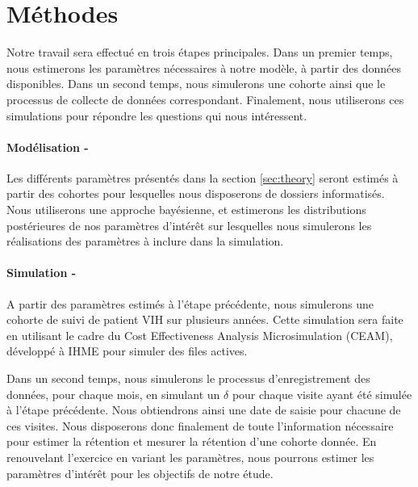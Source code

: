 \documentclass[paper=a4, fontsize=11pt]{scrartcl}
\numberwithin{equation}{section}		%
\numberwithin{figure}{section}			%
\numberwithin{table}{section}				%
\begin{document}
\section{Méthodes}

Notre travail sera effectué en trois étapes principales. Dans un premier temps, nous estimerons les paramètres nécessaires à notre modèle, à partir des données disponibles. Dans un second temps, nous simulerons une cohorte ainsi que le processus de collecte de données correspondant. Finalement, nous utiliserons ces simulations pour répondre les questions qui nous intéressent.

\paragraph{Modélisation -} Les différents paramètres présentés dans la section \ref{sec:theory} seront estimés à partir des cohortes pour lesquelles nous disposerons de dossiers informatisés. Nous utiliserons une approche bayésienne, et estimerons les distributions postérieures de nos paramètres d'intérêt sur lesquelles nous simulerons les réalisations des paramètres à inclure dans la simulation.

\paragraph{Simulation -} A partir des paramètres estimés à l'étape précédente, nous simulerons une cohorte de suivi de patient VIH sur plusieurs années. Cette simulation sera faite en utilisant le cadre du Cost Effectiveness Analysis Microsimulation (CEAM), développé à IHME pour simuler des files actives.

Dans un second temps, nous simulerons le processus d'enregistrement des données, pour chaque mois, en simulant un  $\delta$ pour chaque visite ayant été simulée à l'étape précédente. Nous obtiendrons ainsi une date de saisie pour chacune de ces visites. Nous disposerons donc finalement de toute l'information nécessaire pour estimer la rétention et mesurer la rétention d'une cohorte donnée. En renouvelant l'exercice en variant les paramètres, nous pourrons estimer les paramètres d'intérêt pour les objectifs de notre étude.
\end{document}
